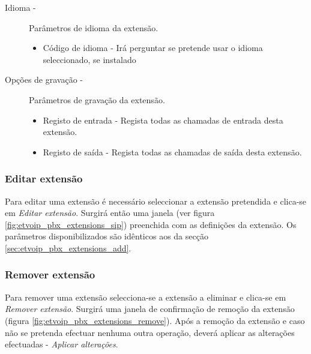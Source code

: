 \begin{description}
\begin{description}
            \item[Idioma -] Parâmetros de idioma da extensão.
                \begin{itemize}
                    \item Código de idioma - Irá perguntar se pretende usar o idioma seleccionado, se instalado
                \end{itemize}

            \item[Opções de gravação -] Parâmetros de gravação da extensão.
                \begin{itemize}
                    \item Registo de entrada - Regista todas as chamadas de entrada desta extensão.
                    \item Registo de saída - Regista todas as chamadas de saída desta extensão.
                \end{itemize}
            
        \end{description}
\end{description}

\subsubsection{Editar extensão}

Para editar uma extensão é necessário seleccionar a extensão pretendida e clica-se em \emph{Editar extensão}. Surgirá então uma janela (ver figura \ref{fig:etvoip_pbx_extensions_sip}) preenchida com as definições da extensão.
Os parâmetros disponibilizados são idênticos aos da secção \ref{sec:etvoip_pbx_extensions_add}.

\subsubsection{Remover extensão}

Para remover uma extensão selecciona-se a extensão a eliminar e clica-se em \emph{Remover extensão}.
Surgirá uma janela de confirmação de remoção da extensão (figura \ref{fig:etvoip_pbx_extensions_remove}). Após a remoção da extensão e caso não se pretenda efectuar nenhuma outra operação, deverá aplicar as alterações efectuadas - \emph{Aplicar alterações}.

